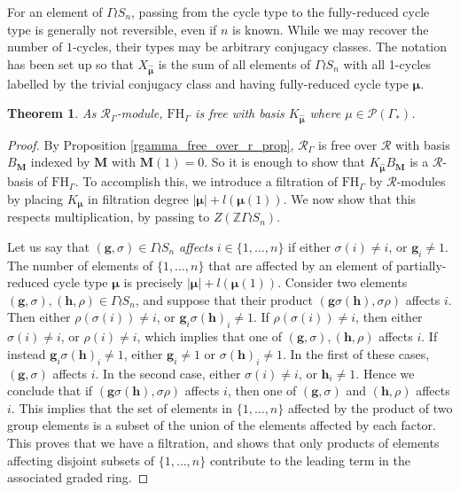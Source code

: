 \documentclass[10pt]{article}
\newtheorem{theorem}{Theorem}[section]
\theoremstyle{definition}
\newcommand{\bs}{\boldsymbol}
\newcommand{\RGamma}{\mathcal{R}_{\Gamma}}
\newcommand{\FHG}{\mathrm{FH}_{\Gamma}}
\begin{document}
For an element of $\Gamma \wr S_n$, passing from the cycle type to the fully-reduced cycle type is generally not reversible, even if $n$ is known. While we may recover the number of $1$-cycles, their types may be arbitrary conjugacy classes. The notation has been set up so that $X_{\bm\hat{\bs \mu}}$ is the sum of all elements of $\Gamma \wr S_n$ with all 1-cycles labelled by the trivial conjugacy class and having fully-reduced cycle type $\bs \mu$.

\begin{theorem}
As $\RGamma$-module, $\FHG$ is free with basis $K_{\bm \hat{\bs \mu}}$ where $\mu \in \mathcal{P}(\Gamma_*)$.
\end{theorem}
\begin{proof}
By Proposition \ref{rgamma_free_over_r_prop}, $\RGamma$ is free over $\mathcal{R}$ with basis $B_{\mathbf{M}}$ indexed by $\mathbf{M}$ with $\mathbf{M}(1) = 0$. So it is enough to show that $K_{\bm\hat{\bs\mu}}B_{\mathbf{M}}$ is a $\mathcal{R}$-basis of $\FHG$. To accomplish this, we introduce a filtration of $\FHG$ by $\mathcal{R}$-modules by placing $K_{\bs \mu}$ in filtration degree $|\bs \mu| + l(\bs\mu(1))$. We now show that this respects multiplication, by passing to $Z(\mathbb{Z} \Gamma \wr S_n)$.

Let us say that $(\mathbf{g}, \sigma) \in \Gamma \wr S_n$ \emph{affects} $i \in \{1,\ldots, n\}$ if either $\sigma(i) \neq i$, or $\mathbf{g}_i \neq 1$. The number of elements of $\{1,\ldots,n\}$ that are affected by an element of partially-reduced cycle type $\bs \mu$ is precisely $|\bs \mu| + l(\bs\mu(1))$. Consider two elements $(\mathbf{g}, \sigma), (\mathbf{h}, \rho) \in \Gamma \wr S_n$, and suppose that their product $(\mathbf{g} \sigma(\mathbf{h}), \sigma \rho)$ affects $i$. Then either $\rho(\sigma(i)) \neq i$, or $\mathbf{g}_i\sigma(\mathbf{h})_i \neq 1$. If $\rho(\sigma(i)) \neq i$, then either $\sigma(i) \neq i$, or $\rho(i) \neq i$, which implies that one of $(\mathbf{g}, \sigma), (\mathbf{h}, \rho)$ affects $i$. If instead $\mathbf{g}_i\sigma(\mathbf{h})_i \neq 1$, either $\mathbf{g}_i \neq 1$ or $\sigma(\mathbf{h})_i \neq 1$. In the first of these cases, $(\mathbf{g}, \sigma)$ affects $i$. In the second case, either $\sigma(i) \neq i$, or $\mathbf{h}_i \neq 1$. Hence we conclude that if $(\mathbf{g} \sigma(\mathbf{h}), \sigma \rho)$ affects $i$, then one of $(\mathbf{g}, \sigma)$ and $(\mathbf{h}, \rho)$ affects $i$. This implies that the set of elements in $\{1,\ldots,n\}$ affected by the product of two group elements is a subset of the union of the elements affected by each factor. This proves that we have a filtration, and shows that only products of elements affecting disjoint subsets of $\{1,\ldots,n\}$ contribute to the leading term in the associated graded ring.


\end{proof}
\end{document}
